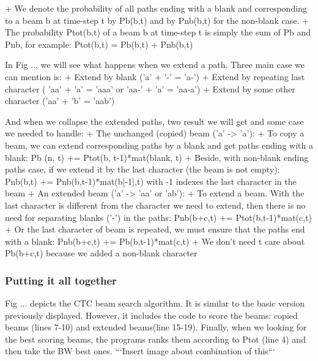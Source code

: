       + We denote the probability of all paths ending with a blank and corresponding to a beam b at time-step t 
      by Pb(b,t) and by Pnb(b,t) for the non-blank case.
      + The probability Ptot(b,t) of a beam b at time-step t is simply the sum of Pb and Pnb, for example:
      Ptot(b,t) = Pb(b,t) + Pnb(b,t)

      In Fig .., we will see what happens when we extend a path. Three main case we can mention
      is: 
        + Extend by blank ('a' + '-' = 'a-')
        + Extend by repeating last character ( 'aa' + 'a' = 'aaa' or 'aa-' + 'a' = 'aa-a')
        + Extend by some other character ('aa' + 'b' = 'aab')
      
      And when we collapse the extended paths, two result we will get and some case we needed to handle:
        + The unchanged (copied) beam ('a' -> 'a'):
          + To copy a beam, we can extend corresponding paths by a blank and get
          paths ending with a blank: Pb (n, t) += Ptot(b, t-1)*mat(blank, t)
          + Beside, with non-blank ending paths case, if we extend it by the last
          character (the beam is not empty): Pnb(b,t) += Pnb(b,t-1)*mat(b[-1],t)
          with -1 indexes the last character in the beam
        + An extended beam ('a' -> 'aa' or 'ab'):
          + To extend a beam. With the last character is different from the character we need
          to extend, then there is no need for separating blanks ('-') in the paths:
            Pnb(b+c,t) += Ptot(b,t-1)*mat(c,t)
          + Or the last character of beam is repeated, we must ensure that the paths
          end with a blank: Pnb(b+c,t) += Pb(b,t-1)*mat(c,t)
          + We don't need t care about Pb(b+c,t) because we added a non-blank character
      \subsubsection{ Putting it all together }
        Fig ... depicts the CTC beam search algorithm. It is similar to the basic version
        previously displayed. However, it includes the code to score the beams: copied beams
        (lines 7-10) and extended beams(line 15-19). Finally, when we looking for the best scoring
        beams, the programs ranks them according to Ptot (line 4) and then take the BW best ones.
        ```Insert image about combination of this```
      

